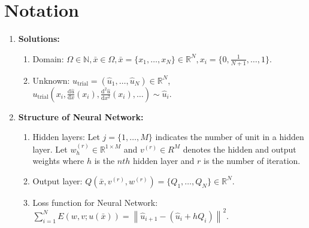 \documentclass{article}
\begin{document}
	\tableofcontents
	\section{Notation}
	\begin{enumerate}
		
		
		\item \textbf{Solutions:} 
		\begin{enumerate}
			\item Domain: $\Omega \in \mathbb{N}, \bar{x} \in \Omega, \bar{x}=\{x_1, \dots, x_N\} \in \mathbb{R}^{N}, x_i=\{0, \frac{1}{N+1}, \dots , 1 \}.$
			\item Unknown:   $u_{\text{trial}}= (\hat{u}_{1}, \dots , \hat{u}_{N}) \in \mathbb{R}^{N}$, $u_{\text{trial}}(x_i, \frac{\mathrm{d}\hat{u}}{\mathrm{d}x}(x_i), \frac{\mathrm{d}^{2}\hat{u}}{\mathrm{d}x^{2}}(x_i), \dots) \sim \hat{u}_{i}$. 
		\end{enumerate}
	\item \textbf{Structure of Neural Network:} 
	\begin{enumerate}
		\item Hidden layers: Let $j=\{1, \dots, M\}$ indicates the number of unit in a hidden layer.  Let $w_{h}^{(r)} \in \mathbb{R}^{1 \times M}$ and $v^{(r)} \in R^{M}$ denotes the hidden and output weights where $h$ is the $nth$ hidden layer and $r$ is the number of iteration. 
		\item Output layer:  $Q(\bar{x},v^{(r)},w^{(r)})=\{Q_1, \dots, Q_N\} \in \mathbb{R}^N$.
		\item Loss function for Neural Network: 
		$\sum_{i=1}^{N} E(w,v;u(\bar{x})) = \left \| \hat{u}_{i+1} - (\hat{u}_{i}+hQ_{i}) \right\|^{2}$.
	\end{enumerate}
		
		
	
	\end{enumerate}
	
	
	
\end{document}
